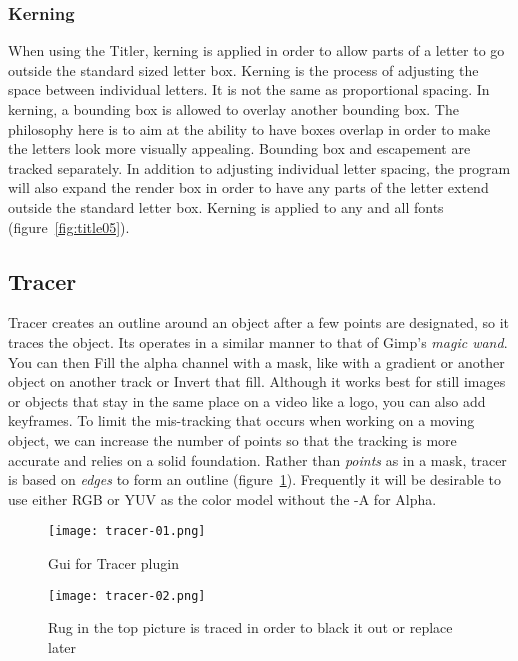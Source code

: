 \subsubsection*{Kerning}%
\label{ssub:kerning}

When using the Titler, kerning is applied in order to allow parts of a letter to go outside the standard sized letter box.  Kerning is the process of adjusting the space between individual letters.  It is not the same as proportional spacing.  In kerning, a bounding box is allowed to overlay another bounding box.  The philosophy here is to aim at the ability to have boxes overlap in order to make the letters look more visually appealing.  Bounding box and escapement are tracked separately.  In addition to adjusting individual letter spacing, the program will also expand the render box in order to have any parts of the letter extend outside the standard letter box.  Kerning is applied to any and all fonts (figure~\ref{fig:title05}).

\subsection{Tracer}%
\label{sub:tracer}

Tracer creates an outline around an object after a few points are designated, so it traces the object. Its operates in a similar manner to that of Gimp's \textit{magic wand}. You can then Fill the alpha channel with a mask, like with a gradient or another object on another track or Invert that fill. Although it works best for still images or objects that stay in the same place on a video like a logo, you can also add keyframes. To limit the mis-tracking that occurs when working on a moving object, we can increase the number of points so that the tracking is more accurate and relies on a solid foundation. Rather than \textit{points} as in a mask, tracer is based on \textit{edges} to form an outline (figure~\ref{fig:tracer-01}). Frequently it will be desirable to use either RGB or YUV as the color model without the -A for Alpha.

\begin{figure}[hbtp]
	\centering
	\texttt{[image: tracer-01.png]}
	\caption{Gui for Tracer plugin}
	\label{fig:tracer-01}
\end{figure}

\begin{figure}[hbtp]
	\centering
	\texttt{[image: tracer-02.png]}
	\caption{Rug in the top picture is traced in order to black it out or replace later}
	\label{fig:tracer-02}
\end{figure}

